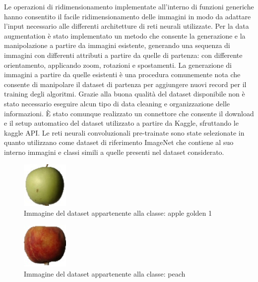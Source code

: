 Le operazioni di ridimensionamento implementate all'interno di funzioni generiche hanno consentito il facile ridimensionamento delle immagini in modo da adattare l'input necessario alle differenti architetture di reti neurali utilizzate.  
Per la data augmentation è stato implementato un metodo che consente la generazione e la manipolazione a partire da immagini esistente, generando una sequenza di immagini con differenti attributi a partire da quelle di partenza: con differente orientamento, applicando zoom, rotazioni e spostamenti.  
La generazione di immagini a partire da quelle esistenti è una procedura comunemente nota che consente di manipolare il dataset di partenza per aggiungere nuovi record per il training degli algoritmi. \cite{dataaugmentation}  
Grazie alla buona qualità del dataset disponibile non è stato necessario eseguire alcun tipo di data cleaning e organizzazione delle informazioni.  
È stato comunque realizzato un connettore che consente il download e il setup automatico del dataset utilizzato a partire da Kaggle, sfruttando le kaggle API. \bigskip
Le reti neurali convoluzionali pre-trainate sono state selezionate in quanto utilizzano come dataset di riferimento ImageNet che contiene al suo interno immagini e classi simili a quelle presenti nel dataset considerato.  

\begin{figure}[H]
    \centering
    \includegraphics[width=0.2\textwidth]{./resources/mela.jpg}
    \caption{Immagine del dataset appartenente alla classe: apple golden 1} 
    \label{fig:mela}
\end{figure}

\begin{figure}[H]
    \centering
    \includegraphics[width=0.2\textwidth]{./resources/pesca.jpg}
    \caption{Immagine del dataset appartenente alla classe: peach} 
    \label{fig:pesca}
\end{figure}

